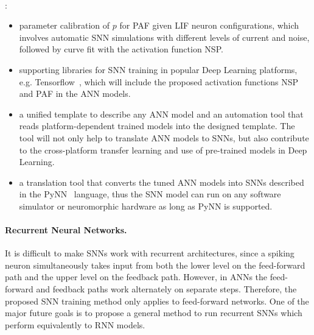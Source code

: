 \paragraph{}
\DIFaddend :

\begin{itemize}
	\item parameter calibration of $p$ for PAF given LIF neuron configurations, which involves automatic SNN simulations with different levels of current and noise, followed by curve fit with the activation function NSP. 

	\item supporting libraries for SNN training in popular Deep Learning platforms, e.g. Tensorflow~\citep{tensorflow2015-whitepaper}, which will include the proposed activation functions NSP and PAF in the ANN models.

	\item a unified template to describe any ANN model and an automation tool that reads platform-dependent trained models into the designed template.
	The tool will not only help to translate ANN models to SNNs, but also contribute to the cross-platform transfer learning and use of pre-trained models in Deep Learning.

	\item a translation tool that converts the tuned ANN models into SNNs described in the PyNN~\citep{davison2008pynn} language, thus the SNN model can run on any software simulator or neuromorphic hardware as long as PyNN is supported.
\end{itemize}

\paragraph{Recurrent Neural Networks\DIFdelbegin {}\DIFdelend .}
It is difficult to make SNNs work with recurrent architectures, since a spiking neuron simultaneously takes input from both the lower level on the feed-forward path and the upper level on the feedback path.
However, in ANNs the feed-forward and feedback paths work alternately on separate steps.
Therefore, the proposed SNN training method only applies to feed-forward networks.
One of the major future goals is to propose a general method to run recurrent SNNs which perform equivalently to RNN models.

